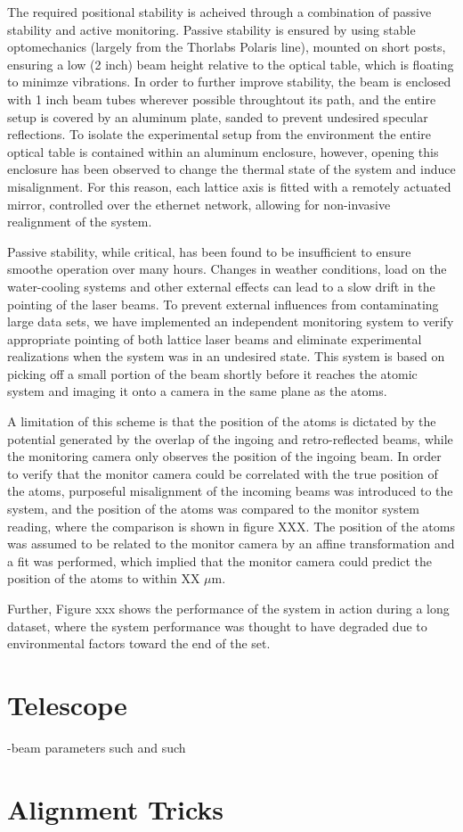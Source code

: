 \documentclass[twocolumn,aps,pra,showpacs,preprintnumbers,bibnotes]{revtex4-1}
\begin{document}
The required positional stability is acheived through a combination of passive stability and active monitoring. 
Passive stability is ensured by using stable optomechanics (largely from the Thorlabs Polaris line), mounted on short posts, ensuring a low (2 inch) beam height relative to the optical table, which is floating to minimze vibrations.
In order to further improve stability, the beam is enclosed with 1 inch beam tubes wherever possible throughtout its path, and the entire setup is covered by an aluminum plate, sanded to prevent undesired specular reflections.
To isolate the experimental setup from the environment the entire optical table is contained within an aluminum enclosure, however, opening this enclosure has been observed to change the thermal state of the system and induce misalignment. 
For this reason, each lattice axis is fitted with a remotely actuated mirror, controlled over the ethernet network, allowing for non-invasive realignment of the system.

Passive stability, while critical, has been found to be insufficient to ensure smoothe operation over many hours. Changes in weather conditions, load on the water-cooling systems and other external effects can lead to a slow drift in the pointing of the laser beams. 
To prevent external influences from contaminating large data sets, we have implemented an independent monitoring system to verify appropriate pointing of both lattice laser beams and eliminate experimental realizations when the system was in an undesired state.
This system is based on picking off a small portion of the beam shortly before it reaches the atomic system and imaging it onto a camera in the same plane as the atoms. 

A limitation of this scheme is that the position of the atoms is dictated by the potential generated by the overlap of the ingoing and retro-reflected beams, while the monitoring camera only observes the position of the ingoing beam.
In order to verify that the monitor camera could be correlated with the true position of the atoms, purposeful misalignment of the incoming beams was introduced to the system, and the position of the atoms was compared to the monitor system reading, where the comparison is shown in figure XXX.
The position of the atoms was assumed to be related to the monitor camera by an affine transformation and a fit was performed, which implied that the monitor camera could predict the position of the atoms to within XX $\mu$m.

Further, Figure xxx shows the performance of the system in action during a long dataset, where the system performance was thought to have degraded due to environmental factors toward the end of the set.

\section{Telescope}
-beam parameters such and such

\section{Alignment Tricks}
\end{document}

